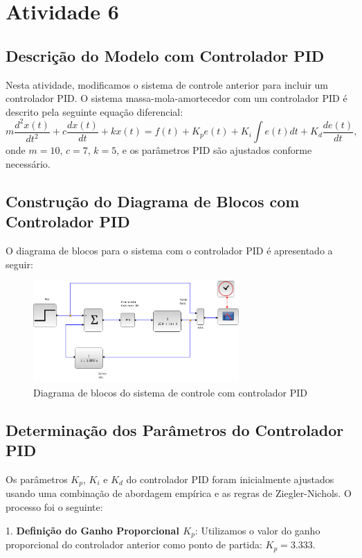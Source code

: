 \section{Atividade 6}

\subsection{Descrição do Modelo com Controlador PID}
Nesta atividade, modificamos o sistema de controle anterior para incluir um controlador PID. O sistema massa-mola-amortecedor com um controlador PID é descrito pela seguinte equação diferencial:
\[
    m\frac{d^2x(t)}{dt^2} + c\frac{dx(t)}{dt} + kx(t) = f(t) + K_p e(t) + K_i \int e(t) dt + K_d \frac{de(t)}{dt},
\]
onde \( m = 10 \), \( c = 7 \), \( k = 5 \), e os parâmetros PID são ajustados conforme necessário.

\subsection{Construção do Diagrama de Blocos com Controlador PID}
O diagrama de blocos para o sistema com o controlador PID é apresentado a seguir:

\begin{figure}[H]
    \centering
    \includegraphics[width=0.7\textwidth]{6-atividade/assets/diagrama-a.png}
    \caption{Diagrama de blocos do sistema de controle com controlador PID}
    \label{fig:diagrama_blocos_pid}
\end{figure}

\subsection{Determinação dos Parâmetros do Controlador PID}
Os parâmetros \(K_p\), \(K_i\) e \(K_d\) do controlador PID foram inicialmente ajustados usando uma combinação de abordagem empírica e as regras de Ziegler-Nichols. O processo foi o seguinte:

1. \textbf{Definição do Ganho Proporcional \(K_p\)}:
Utilizamos o valor do ganho proporcional do controlador anterior como ponto de partida: \(K_p = 3.333\).

